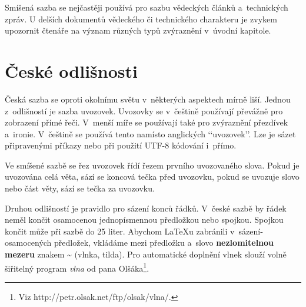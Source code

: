 \documentclass[11pt,a4paper,twocolumn]{article}
\begin{document}
Smíšená sazba se nejčastěji používá pro sazbu vě\-dec\-kých článků a~technických zpráv. U delší­ch do\-ku\-ment\-ů vědeckého či technického charakteru je zvykem upozornit čtenáře na význam různých typů zvý\-raz\-ně\-ní­ v~úvodní­ kapitole.

\section{České odlišnosti}

Česká sazba se oproti okolní­mu světu v~některých as\-pekt\-ech mí­rně liší­. Jednou z~odlišností je sazba uvozovek. Uvozovky se v~češtině použí­vají­ převážně pro zobrazení­ pří­mé řeči. V~menší­ míře se použí­vají­ také pro zvý\-raz\-ně\-ní­ přezdí­vek a~ironie. V~češtině se použí­vá tento  namí­sto anglických ‘‘uvozovek’’. Lze je sázet připravenými příkazy nebo při použití UTF-8 kódování i~přímo.

Ve smíšené sazbě se řez uvozovek ří­dí­ řezem prv\-ní\-­ho uvozovaného slova. Pokud je uvozována ce\-lá věta, sází­ se koncová tečka před u\-vo\-zov\-ku, pokud se uvozuje slovo nebo část věty, sází­ se tečka za u\-voz\-ov\-ku.

Druhou odlišností je pravidlo pro sázení­ konců řád\-ků. V~české sazbě by řádek neměl končit osamocenou jednopí­smennou předložkou nebo spojkou. Spojkou  končit může při sazbě do 25 liter. Abychom {\LaTeX}u zabránili v~sázení­ osamocených předložek, vkládáme mezi předložku a~slovo \textbf{nezlomitelnou mezeru} znakem \~{} (vlnka, tilda). Pro automatické do\-pl\-ně\-ní vlnek slouží­ volně šiřitelný program \emph{vlna} od pana Olšáka\footnote{Viz http://petr.olsak.net/ftp/olsak/vlna/.}.
\end{document}
